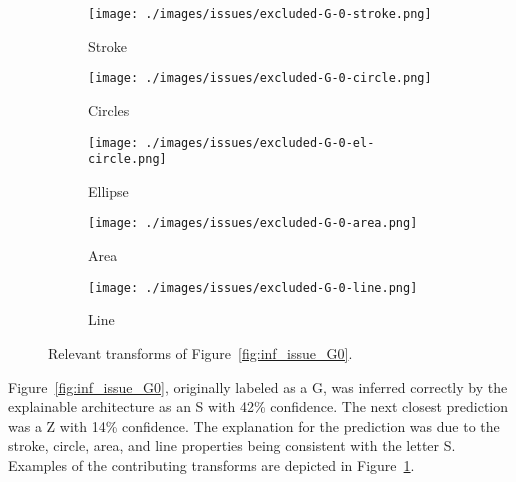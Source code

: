 \begin{figure}[h]
    \centering
    \begin{subfigure}{.20\textwidth}
        \centering
        \texttt{[image: ./images/issues/excluded-G-0-stroke.png]}
        \caption{Stroke}
    \end{subfigure}%
    \begin{subfigure}{.20\textwidth}
        \centering
        \texttt{[image: ./images/issues/excluded-G-0-circle.png]}
        \caption{Circles}
    \end{subfigure}%
    \begin{subfigure}{.20\textwidth}
        \centering
        \texttt{[image: ./images/issues/excluded-G-0-el-circle.png]}
        \caption{Ellipse}
    \end{subfigure}%
    \begin{subfigure}{.20\textwidth}
        \centering
        \texttt{[image: ./images/issues/excluded-G-0-area.png]}
        \caption{Area}
    \end{subfigure}%
    \begin{subfigure}{.20\textwidth}
        \centering
        \texttt{[image: ./images/issues/excluded-G-0-line.png]}
        \caption{Line}
    \end{subfigure}
    \caption{Relevant transforms of Figure~\ref{fig:inf_issue_G0}.}
    \label{fig:g0_trans}
\end{figure}

Figure~\ref{fig:inf_issue_G0}, originally labeled as a G, was inferred correctly by
the explainable architecture as an S with 42\% confidence.  The next closest
prediction was a Z with 14\% confidence.  The explanation for the prediction was
due to the stroke, circle, area, and line properties being consistent with the
letter S. Examples of the contributing transforms are depicted in
Figure~\ref{fig:g0_trans}.

